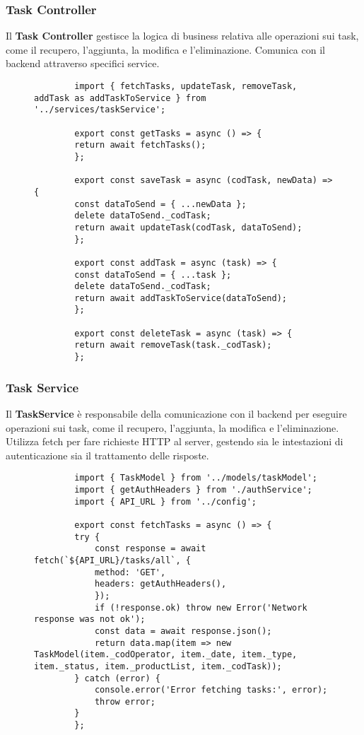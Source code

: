 \subsubsection{Task Controller}
Il \textbf{Task Controller} gestisce la logica di business relativa alle operazioni sui task, come il recupero, l'aggiunta,
la modifica e l'eliminazione. Comunica con il backend attraverso specifici service.
\begin{figure}[H]
    \centering
    \begin{verbatim}
        import { fetchTasks, updateTask, removeTask, addTask as addTaskToService } from '../services/taskService';

        export const getTasks = async () => {
        return await fetchTasks();
        };

        export const saveTask = async (codTask, newData) => {
        const dataToSend = { ...newData };
        delete dataToSend._codTask;
        return await updateTask(codTask, dataToSend);
        };

        export const addTask = async (task) => {
        const dataToSend = { ...task };
        delete dataToSend._codTask;
        return await addTaskToService(dataToSend);
        };

        export const deleteTask = async (task) => {
        return await removeTask(task._codTask);
        };
\end{verbatim}
\end{figure}

\subsubsection{Task Service}
Il \textbf{TaskService} è responsabile della comunicazione con il backend per eseguire operazioni sui task,
come il recupero, l'aggiunta, la modifica e l'eliminazione.\\ Utilizza fetch per fare richieste HTTP al server,
gestendo sia le intestazioni di autenticazione sia il trattamento delle risposte.
\begin{figure}[H]
    \centering
    \begin{verbatim}
        import { TaskModel } from '../models/taskModel';
        import { getAuthHeaders } from './authService';
        import { API_URL } from '../config';

        export const fetchTasks = async () => {
        try {
            const response = await fetch(`${API_URL}/tasks/all`, {
            method: 'GET',
            headers: getAuthHeaders(),
            });
            if (!response.ok) throw new Error('Network response was not ok');
            const data = await response.json();
            return data.map(item => new TaskModel(item._codOperator, item._date, item._type, item._status, item._productList, item._codTask));
        } catch (error) {
            console.error('Error fetching tasks:', error);
            throw error;
        }
        };

\end{verbatim}
\end{figure}

